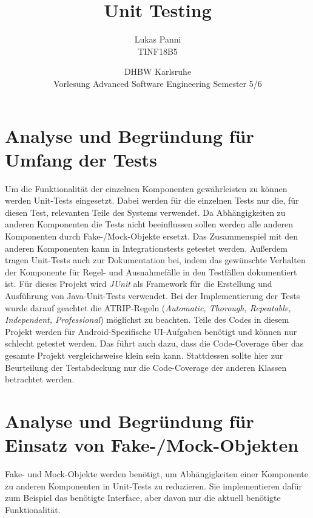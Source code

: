 \documentclass[12pt]{article}
\title{Unit Testing}
\date{DHBW Karlsruhe\\ Vorlesung Advanced Software Engineering Semester 5/6}
\author{Lukas Panni \\ TINF18B5}
\begin{document}
\maketitle

\newpage
\tableofcontents
\newpage


\section{Analyse und Begründung für Umfang der Tests}

Um die Funktionalität der einzelnen Komponenten gewährleisten zu können werden Unit-Tests eingesetzt.
Dabei werden für die einzelnen Tests nur die, für diesen Test, relevanten Teile des Systems verwendet.
Da Abhängigkeiten zu anderen Komponenten die Tests nicht beeinflussen sollen werden alle anderen Komponenten durch Fake-/Mock-Objekte ersetzt.
Das Zusammenspiel mit den anderen Komponenten kann in Integrationstests getestet werden.
Außerdem tragen Unit-Tests auch zur Dokumentation bei, indem das gewünschte Verhalten der Komponente für Regel- und Ausnahmefälle in den Testfällen dokumentiert ist.
\newline
Für dieses Projekt wird \textit{JUnit} als Framework für die Erstellung und Ausführung von Java-Unit-Tests verwendet.
Bei der Implementierung der Tests wurde darauf geachtet die ATRIP-Regeln (\textit{Automatic, Thorough, Repeatable, Independent, Professional}) möglichst zu beachten.
\newline
Teile des Codes in diesem Projekt werden für Android-Spezifische UI-Aufgaben benötigt und können nur schlecht getestet werden. Das führt auch dazu, dass die Code-Coverage über das gesamte Projekt vergleichsweise klein sein kann. Stattdessen sollte hier zur Beurteilung der Testabdeckung nur die Code-Coverage der anderen Klassen betrachtet werden.


\newpage
\section{Analyse und Begründung für Einsatz von Fake-/Mock-Objekten}

Fake- und Mock-Objekte werden benötigt, um Abhängigkeiten einer Komponente zu anderen Komponenten in Unit-Tests zu reduzieren.
Sie implementieren dafür zum Beispiel das benötigte Interface, aber davon nur die aktuell benötigte Funktionalität.
\end{document}
